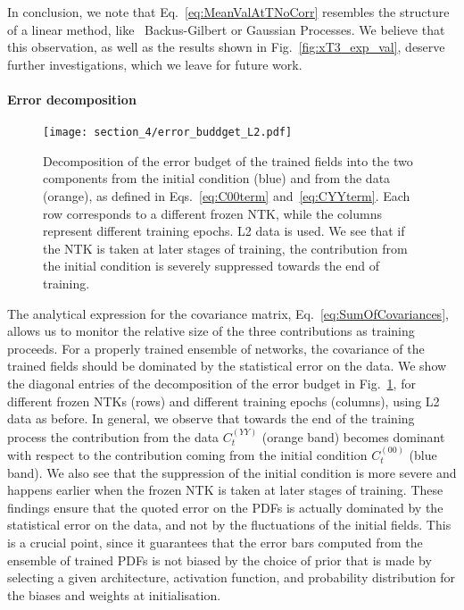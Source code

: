 In conclusion, we note that Eq.~\eqref{eq:MeanValAtTNoCorr} resembles the structure
of a linear method, like \eg\ Backus-Gilbert or Gaussian Processes. We believe
that this observation, as well as the results shown in
Fig.~\ref{fig:xT3_exp_val}, deserve further investigations, which we leave for
future work.

\paragraph{Error decomposition}
\begin{figure}[t!]
  \centering
  \texttt{[image: section\_4/error\_buddget\_L2.pdf]}
  \caption{Decomposition of the error budget of the trained fields into the two
  components from the initial condition (blue) and from the data (orange), as
  defined in Eqs.~\eqref{eq:C00term} and~\eqref{eq:CYYterm}. Each row
  corresponds to a different frozen NTK, while the columns represent different
  training epochs. L2 data is used. We see that if the NTK is taken at later
  stages of training, the contribution from the initial condition is
  severely suppressed towards the end of training. }
  \label{fig:ErrorBudgetL2}
\end{figure}
The analytical expression for the covariance matrix,
Eq.~\eqref{eq:SumOfCovariances}, allows us to monitor the relative size of the
three contributions as training proceeds. For a properly trained ensemble of 
networks, the covariance of the trained fields should be
dominated by the statistical error on the data. We show the diagonal entries of
the decomposition of the error budget in Fig.~\ref{fig:ErrorBudgetL2}, for
different frozen NTKs (rows) and different training epochs (columns), using L2
data as before. In general, we observe that towards the end of the training 
process the
contribution from the data $C_t^{(YY)}$ (orange band) becomes dominant with
respect to the contribution coming from the initial condition $C_t^{(00)}$ (blue
band). We also see that the suppression of the initial condition is more severe
and happens earlier when the frozen NTK is taken at later stages of training.
These findings ensure that the quoted error on the PDFs is actually dominated by
the statistical error on the data, and not by the fluctuations of the initial
fields. This is a crucial point, since it guarantees that the error bars computed
from the ensemble of
trained PDFs is not biased by the choice of prior that is made by selecting a
given architecture, activation function, and probability distribution for the
biases and weights at initialisation.

